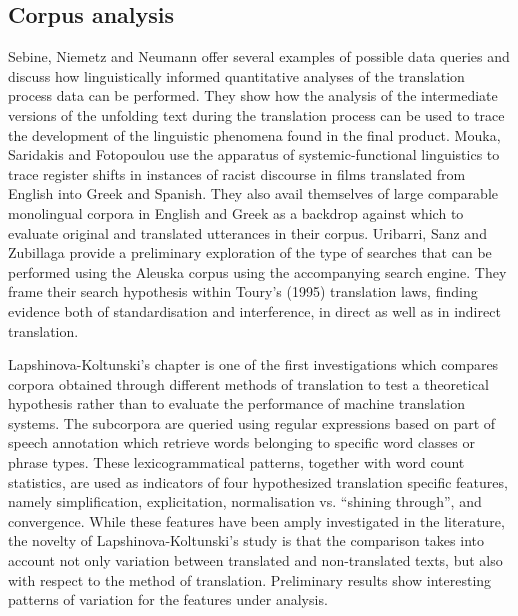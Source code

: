 \begin{refsection}
\section{Corpus analysis}
Sebine, Niemetz and Neumann offer several examples of possible data queries and discuss how linguistically informed quantitative analyses of the translation process data can be performed. They show how the analysis of the intermediate versions of the unfolding text during the translation process can be used to trace the development of the linguistic phenomena found in the final product. Mouka, Saridakis and Fotopoulou use the apparatus of systemic-functional linguistics to trace register shifts in instances of racist discourse in films translated from English into Greek and Spanish. They also avail themselves of large comparable monolingual corpora in English and Greek as a backdrop against which to evaluate original and translated utterances in their corpus. Uribarri, Sanz and Zubillaga provide a preliminary exploration of the type of searches that can be performed using the Aleuska corpus using the accompanying search engine. They frame their search hypothesis within Toury’s (1995) translation laws, finding evidence both of standardisation and interference, in direct as well as in indirect translation.
 
Lapshinova-Koltunski’s chapter is one of the first investigations which compares corpora obtained through different methods of translation to test a theoretical hypothesis rather than to evaluate the performance of machine translation systems. The subcorpora are queried using regular expressions based on part of speech annotation which retrieve words belonging to specific word classes or phrase types. These lexicogrammatical patterns, together with word count statistics, are used as indicators of four hypothesized translation specific features, namely simplification, explicitation, normalisation vs. “shining through”, and convergence. While these features have been amply investigated in the literature, the novelty of Lapshinova-Koltunski’s study is that the comparison takes into account not only variation between translated and non-translated texts, but also with respect to the method of translation. Preliminary results show interesting patterns of variation for the features under analysis.


\end{refsection}

